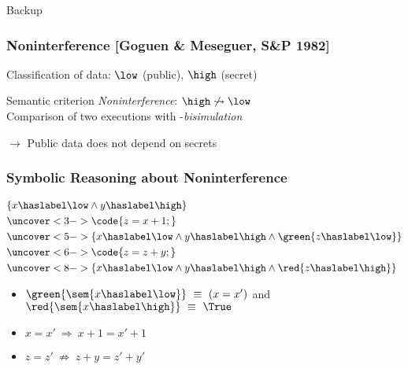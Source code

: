 \begin{frame}
    \centering
    Backup
\end{frame}

\appendix

\begin{frame}[fragile]
    \frametitle{Noninterference [Goguen \& Meseguer, S\&P 1982]}

    Classification of data: $\low$ (public), $\high$ (secret)
    \bigskip

    Semantic criterion \emph{Noninterference}: $\high \not\rightsquigarrow \low$ \\

    \bigskip
    \pause
    Comparison of two executions with \low-\emph{bisimulation}
    \medskip


    \medskip
    \pause

    \alert{$\to$ Public data does not depend on secrets}
\end{frame}


\begin{frame}[fragile]
    \frametitle{Symbolic Reasoning about Noninterference}

    \begin{align}
        & \{ x \haslabel \low \land y \haslabel \high \} \notag \\
        & \uncover<3->{\code{z = x + 1;}} \label{eq:1} \\
        & \uncover<5->{\{ x \haslabel \low \land y \haslabel \high \land \green{z \haslabel \low} \}} \notag \\
        & \uncover<6->{\code{z = z + y;}} \label{eq:2} \\
        & \uncover<8->{\{ x \haslabel \low \land y \haslabel \high \land \red{z \haslabel \high} \}} \notag
    \end{align}

    \begin{itemize}
    \item<2-> $\green{\sem{x \haslabel \low}} ~\equiv~ (x = x')$ and $\red{\sem{x \haslabel \high}} ~\equiv~ \True$
    \item<4->[\Yes] $x = x' ~\Longrightarrow~ x+1 = x'+1$
    \item<7->[\No]  $z = z' ~\not\Longrightarrow~ z+y = z'+y'$
    \end{itemize}
\end{frame}

